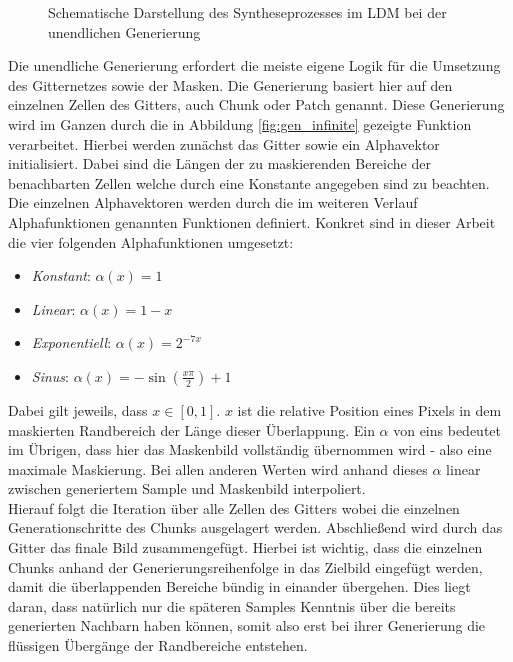 \begin{figure}[H]
    \centering
    \caption{Schematische Darstellung des Syntheseprozesses im \ac{LDM} bei der unendlichen Generierung}
    \label{fig:infinite}
\end{figure}
Die unendliche Generierung erfordert die meiste eigene Logik für die Umsetzung des Gitternetzes sowie der Masken. Die Generierung basiert hier auf den einzelnen Zellen des Gitters, auch Chunk oder Patch genannt. Diese Generierung wird im Ganzen durch die in Abbildung \ref{fig:gen_infinite} gezeigte Funktion verarbeitet. Hierbei werden zunächst das Gitter sowie ein Alphavektor initialisiert. Dabei sind die Längen der zu maskierenden Bereiche der benachbarten Zellen welche durch eine Konstante angegeben sind zu beachten. Die einzelnen Alphavektoren werden durch die im weiteren Verlauf Alphafunktionen genannten Funktionen definiert. Konkret sind in dieser Arbeit die vier folgenden Alphafunktionen umgesetzt: 
\begin{itemize}
    \item \textit{Konstant}: $\alpha(x) = 1$
    \item \textit{Linear}: $\alpha(x) = 1 - x$
    \item \textit{Exponentiell}: $\alpha(x) = 2^{-7x}$
    \item \textit{Sinus}: $\alpha(x) = -\sin(\frac{x\pi}{2}) + 1$
\end{itemize}
Dabei gilt jeweils, dass $x \in [0,1]$. $x$ ist die relative Position eines Pixels in dem maskierten Randbereich der Länge dieser Überlappung. Ein $\alpha$ von eins bedeutet im Übrigen, dass hier das Maskenbild vollständig übernommen wird - also eine maximale Maskierung. Bei allen anderen Werten wird anhand dieses $\alpha$ linear zwischen generiertem Sample und Maskenbild interpoliert. \\
Hierauf folgt die Iteration über alle Zellen des Gitters wobei die einzelnen Generationschritte des Chunks ausgelagert werden. Abschließend wird durch das Gitter das finale Bild zusammengefügt. Hierbei ist wichtig, dass die einzelnen Chunks anhand der Generierungsreihenfolge in das Zielbild eingefügt werden, damit die überlappenden Bereiche bündig in einander übergehen. Dies liegt daran, dass natürlich nur die späteren Samples Kenntnis über die bereits generierten Nachbarn haben können, somit also erst bei ihrer Generierung die flüssigen Übergänge der Randbereiche entstehen. \\
